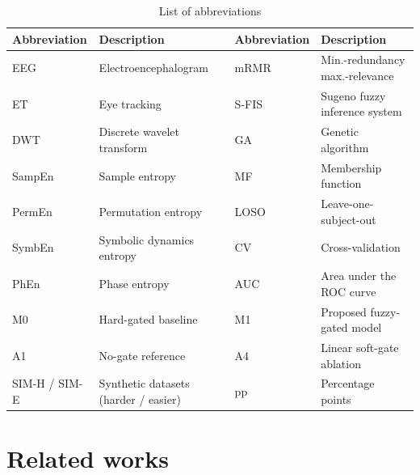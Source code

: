 \documentclass[11pt,a4paper]{article}
\begin{document}
\begin{table}[t]
\centering\small
\caption{List of abbreviations}\label{tab:abbr}
\begin{tabular}{@{}ll@{\hspace{2em}}ll@{}}
\toprule
Abbreviation & Description & Abbreviation & Description\\
\midrule
EEG & Electroencephalogram & mRMR & Min.-redundancy max.-relevance\\
ET & Eye tracking & S-FIS & Sugeno fuzzy inference system\\
DWT & Discrete wavelet transform & GA & Genetic algorithm\\
SampEn & Sample entropy & MF & Membership function\\
PermEn & Permutation entropy & LOSO & Leave-one-subject-out\\
SymbEn & Symbolic dynamics entropy & CV & Cross-validation\\
PhEn & Phase entropy & AUC & Area under the ROC curve\\
M0 & Hard-gated baseline & M1 & Proposed fuzzy-gated model\\
A1 & No-gate reference & A4 & Linear soft-gate ablation\\
SIM-H / SIM-E & Synthetic datasets (harder / easier) & pp & Percentage points\\
\bottomrule
\end{tabular}
\end{table}

\section{Related works}
\label{sec:related}
\end{document}
